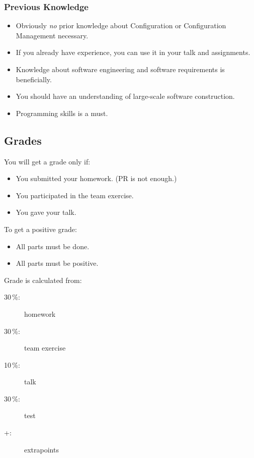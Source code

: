 \begin{frame}
	\frametitle{Previous Knowledge}
	\begin{itemize}
		\item Obviously \textit{no} prior knowledge about Configuration or Configuration Management necessary.
		\item If you already have experience, you can use it in your talk and assignments.
		\item Knowledge about software engineering and software requirements is beneficially.
		\item You should have an understanding of large-scale software construction.
		\item Programming skills is a must.
	\end{itemize}
\end{frame}

\subsection{Grades}
\begin{frame}
	You will get a grade only if:
	\begin{itemize}
		\item You submitted your homework. (PR is not enough.)
		\item You participated in the team exercise.
		\item You gave your talk.
	\end{itemize}
\end{frame}

\begin{frame}
	To get a positive grade:
	\begin{itemize}
		\item All parts must be done.
		\item All parts must be positive.
	\end{itemize}
\end{frame}

\begin{frame}
	Grade is calculated from:
	\begin{description}
	\item[30\,\%:] homework
	\item[30\,\%:] team exercise
	\item[10\,\%:] talk
	\item[30\,\%:] test
	\item[+:] extrapoints
	\end{description}
\end{frame}

